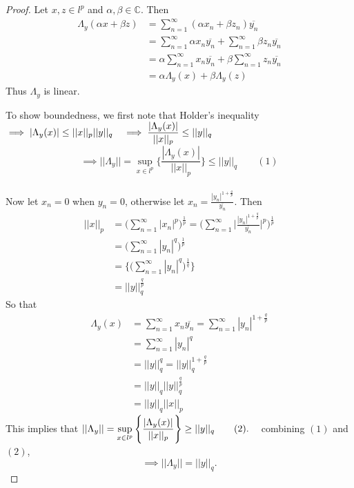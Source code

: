 \documentclass[11pt,a4paper]{article}
\theoremstyle{definition}
\begin{document}
\begin{proof}
Let $x,z\in l^p$ and $\alpha, \beta \in \mathbb{C}$. Then
\begin{align*}
\Lambda_y(\alpha x+\beta z) &=\sum^{\infty}_{n=1}(\alpha x_n+\beta z_n)\overline{y_n}\\
                            &=\sum_{n=1}^{\infty}\alpha x_n\overline{y_n}+\sum_{n=1}^{\infty}\beta z_n\overline{y_n}\\
                            &=\alpha \sum^{\infty}_{n=1}x_n\overline{y_n}+\beta \sum^{\infty}_{n=1}z_n\overline{y_n}\\
                            &=\alpha \Lambda_y(x)+\beta \Lambda_y(z)
\end{align*}
Thus $\Lambda_y$ is linear.

To show boundedness, we first note that Holder's inequality\\ $\implies |\Lambda_y(x)|\leq ||x||_p||y||_q\hspace{0.3cm}\implies \displaystyle{\frac{|\Lambda_y(x)|}{||x||_p}\leq ||y||_q}$ $$\implies ||\Lambda_y||=\sup_{x\in l^p}\Bigg\{\frac{|\Lambda_y(x)|}{||x||_p}\Bigg\}\leq ||y||_q\qquad (1)$$\\ Now let $x_n=0$ when $y_n=0$, otherwise let \hspace{0.3cm}$\displaystyle{x_n=\frac{|y_n|^{1+\frac{q}{p}}}{\overline{y_n}}}.$ Then
\begin{align*}
||x||_p &=\Bigg(\sum^{\infty}_{n=1}|x_n|^p\Bigg)^{\frac{1}{p}}
         =\Bigg(\sum^{\infty}_{n=1}\Bigg|\frac{|y_n|^{1+\frac{q}{p}}}{\overline{y_n}}\Bigg|^p\Bigg)^{\frac{1}{p}}\\
        &=\Bigg(\sum_{n=1}^{\infty}|y_n|^q\Bigg)^{\frac{1}{p}}\\
        &=\Bigg\{\Bigg(\sum^{\infty}_{n=1}|y_n|^q\Bigg)^{\frac{1}{q}}\Bigg\}\\
        &=||y||^{\frac{q}{p}}_q
\end{align*}
So that 
\begin{align*}
\Lambda_y(x) &=\sum^{\infty}_{n=1}x_n\overline{y_n}
              =\sum^{\infty}_{n=1}|y_n|^{1+\frac{q}{p}}\\
             &=\sum^{\infty}_{n=1}|y_n|^q\\
             &=||y||^q_q
              =||y||^{1+\frac{q}{p}}_q\\
             &=||y||_q||y||_q^{\frac{q}{p}}\\
             &=||y||_q||x||_p
\end{align*}
This implies that \hspace{0.3cm}$\displaystyle{||\Lambda_y||=\sup_{x\in l^p}\Bigg\{\frac{|\Lambda_y(x)|}{||x||_p}\Bigg\}\geq ||y||_q\qquad (2)}.\hspace{0.3cm}$ combining $(1)$ and $(2)$, $$\implies ||\Lambda_y||=||y||_q.$$
\end{proof}
\end{document}
